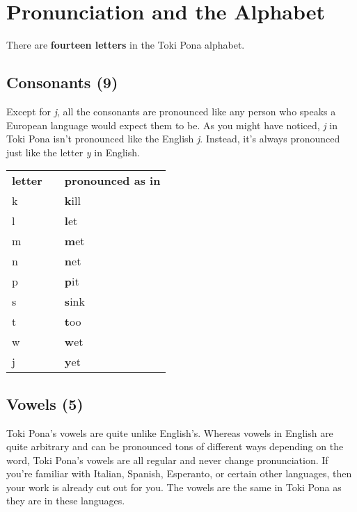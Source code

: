 \label{'pronunciation_alphabet'}
\section{Pronunciation and the Alphabet}
%
There are \textbf{fourteen letters} in the Toki Pona alphabet.

\subsection*{Consonants (9)}

Except for \textit{j}, all the consonants are pronounced like any person who speaks a European language would expect them to be. 
As you might have noticed, \textit{j} in Toki Pona isn't pronounced like the English \textit{j}. 
Instead, it's always pronounced just like the letter \textit{y} in English. 

\begin{supertabular}{p{5,5cm}|ll}
\textbf{letter}   &&    \textbf{pronounced as in} \\ %
k && \textbf{k}ill \\ %
l && \textbf{l}et \\ %
m && \textbf{m}et \\ %
n && \textbf{n}et \\ %
p && \textbf{p}it \\ %
s && \textbf{s}ink \\ %
t && \textbf{t}oo \\ %
w && \textbf{w}et \\ %
j && \textbf{y}et \\ %
\end{supertabular} 

\subsection*{Vowels (5)}
%
Toki Pona's vowels are quite unlike English's. Whereas vowels in English are quite arbitrary and can be pronounced tons of different ways depending on the word, Toki Pona's vowels are all regular and never change pronunciation. 
If you're familiar with Italian, Spanish, Esperanto, or certain other languages, then your work is already cut out for you. The vowels are the same in Toki Pona as they are in these languages. 

